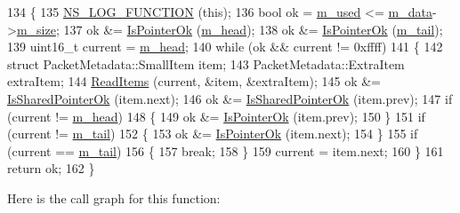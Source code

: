 \begin{DoxyCode}
134 \{
135   \hyperlink{log-macros-disabled_8h_a90b90d5bad1f39cb1b64923ea94c0761}{NS\_LOG\_FUNCTION} (\textcolor{keyword}{this});
136   \textcolor{keywordtype}{bool} ok = \hyperlink{classns3_1_1PacketMetadata_afeecb22fe6f3368f3c56bda755892df9}{m\_used} <= \hyperlink{classns3_1_1PacketMetadata_a6a7206086aec2a73a094fe072650b9ee}{m\_data}->\hyperlink{structns3_1_1PacketMetadata_1_1Data_a1064e5617aec301dd4f28fb86c105848}{m\_size};
137   ok &= \hyperlink{classns3_1_1PacketMetadata_acf15fba7d020ebd77591619b5ad273c5}{IsPointerOk} (\hyperlink{classns3_1_1PacketMetadata_a46b3ef0a9a80a798ad1e81b5694a5658}{m\_head});
138   ok &= \hyperlink{classns3_1_1PacketMetadata_acf15fba7d020ebd77591619b5ad273c5}{IsPointerOk} (\hyperlink{classns3_1_1PacketMetadata_ad24a659e236af7b98c475c97c4f60db9}{m\_tail});
139   uint16\_t current = \hyperlink{classns3_1_1PacketMetadata_a46b3ef0a9a80a798ad1e81b5694a5658}{m\_head};
140   \textcolor{keywordflow}{while} (ok && current != 0xffff)
141     \{
142       \textcolor{keyword}{struct }PacketMetadata::SmallItem item;
143       PacketMetadata::ExtraItem extraItem;
144       \hyperlink{classns3_1_1PacketMetadata_a3719ad2c32313a9a1c74462322e8b517}{ReadItems} (current, &item, &extraItem);
145       ok &= \hyperlink{classns3_1_1PacketMetadata_ae62c5bb3dce611a0f8c5e9ba3ba8e26e}{IsSharedPointerOk} (item.next);
146       ok &= \hyperlink{classns3_1_1PacketMetadata_ae62c5bb3dce611a0f8c5e9ba3ba8e26e}{IsSharedPointerOk} (item.prev);
147       \textcolor{keywordflow}{if} (current != \hyperlink{classns3_1_1PacketMetadata_a46b3ef0a9a80a798ad1e81b5694a5658}{m\_head})
148         \{
149           ok &= \hyperlink{classns3_1_1PacketMetadata_acf15fba7d020ebd77591619b5ad273c5}{IsPointerOk} (item.prev);
150         \}
151       \textcolor{keywordflow}{if} (current != \hyperlink{classns3_1_1PacketMetadata_ad24a659e236af7b98c475c97c4f60db9}{m\_tail})
152         \{
153           ok &= \hyperlink{classns3_1_1PacketMetadata_acf15fba7d020ebd77591619b5ad273c5}{IsPointerOk} (item.next);
154         \}
155       \textcolor{keywordflow}{if} (current == \hyperlink{classns3_1_1PacketMetadata_ad24a659e236af7b98c475c97c4f60db9}{m\_tail})
156         \{
157           \textcolor{keywordflow}{break};
158         \}
159       current = item.next;
160     \}
161   \textcolor{keywordflow}{return} ok;
162 \}
\end{DoxyCode}


Here is the call graph for this function\+:




